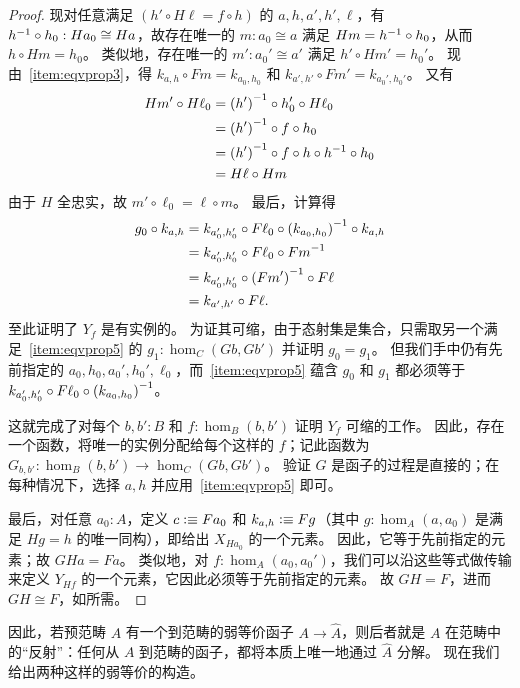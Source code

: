 \begin{proof}
  现对任意满足 $(h' \circ H\ell = f \circ h)$ 的 $a,h,a',h',\ell$，有 ${h}^{-1}\circ h_0:Ha_0\cong Ha$，故存在唯一的 $m:a_0\cong a$ 满足 $Hm = {h}^{-1}\circ h_0$，从而 $h\circ Hm = h_0$。
  类似地，存在唯一的 $m':a_0'\cong a'$ 满足 $h'\circ Hm' = h_0'$。
  现由~\ref{item:eqvprop3}，得 $k_{a,h}\circ Fm = k_{a_0,h_0}$ 和 $k_{a',h'}\circ Fm' = k_{a_0',h_0'}$。
  又有
  \begin{align*}
    Hm' \circ H\ell_0
    &= {(h')}^{-1} \circ h_0' \circ H\ell_0\\
    &= {(h')}^{-1} \circ f \circ h_0\\
    &= {(h')}^{-1} \circ f \circ h \circ {h}^{-1} \circ h_0\\
    &= H\ell \circ Hm
  \end{align*}
  由于 $H$ 全忠实，故 $m'\circ \ell_0 = \ell\circ m$。
  最后，计算得
  \begin{align*}
    g_0 \circ k_{a,h}
    &= k_{a_0',h_0'} \circ F \ell_0 \circ {(k_{a_0,h_0})}^{-1} \circ k_{a,h}\\
    &= k_{a_0',h_0'} \circ F \ell_0 \circ {Fm}^{-1}\\
    &= k_{a_0',h_0'} \circ {(Fm')}^{-1} \circ F\ell\\
    &= k_{a',h'}\circ F\ell.
  \end{align*}
  至此证明了 $Y_f$ 是有实例的。
  为证其可缩，由于态射集是集合，只需取另一个满足~\ref{item:eqvprop5} 的 $g_1:\hom_C(Gb,Gb')$ 并证明 $g_0=g_1$。
  但我们手中仍有先前指定的 $a_0,h_0,a_0',h_0',\ell_0$，而~\ref{item:eqvprop5} 蕴含 $g_0$ 和 $g_1$ 都必须等于 $k_{a_0',h_0'} \circ F \ell_0 \circ {(k_{a_0,h_0})}^{-1}$。

  这就完成了对每个 $b,b':B$ 和 $f:\hom_B(b,b')$ 证明 $Y_f$ 可缩的工作。
  因此，存在一个函数，将唯一的实例分配给每个这样的 $f$；记此函数为 $G_{b,b'}:\hom_B(b,b') \to \hom_C(Gb,Gb')$。
  验证 $G$ 是函子的过程是直接的；在每种情况下，选择 $a,h$ 并应用~\ref{item:eqvprop5} 即可。

  最后，对任意 $a_0:A$，定义 $c\vcentcolon\equiv Fa_0$ 和 $k_{a,h}\vcentcolon\equiv F g$（其中 $g:\hom_A(a,a_0)$ 是满足 $Hg = h$ 的唯一同构），即给出 $X_{Ha_0}$ 的一个元素。
  因此，它等于先前指定的元素；故 $GHa=Fa$。
  类似地，对 $f:\hom_A(a_0,a_0')$，我们可以沿这些等式做传输来定义 $Y_{Hf}$ 的一个元素，它因此必须等于先前指定的元素。
  故 $GH=F$，进而 $GH\cong F$，如所需。
\end{proof}

%
因此，若预范畴 $A$ 有一个到范畴的弱等价函子 $A\to \widehat{A}$，则后者就是 $A$ 在范畴中的``反射''：任何从 $A$ 到范畴的函子，都将本质上唯一地通过 $\widehat{A}$ 分解。
现在我们给出两种这样的弱等价的构造。

